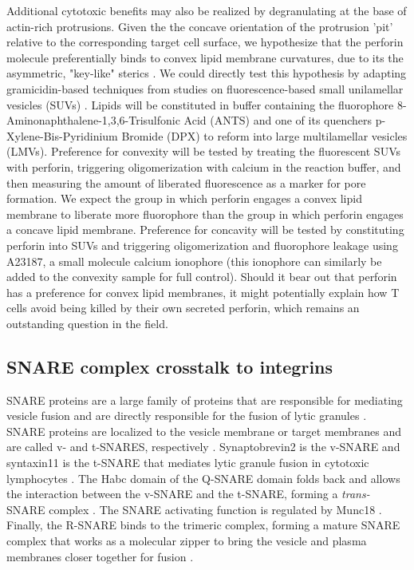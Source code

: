 Additional cytotoxic benefits may also be realized by degranulating at the base of actin-rich protrusions. Given the the concave orientation of the protrusion 'pit' relative to the corresponding target cell surface, we hypothesize that the perforin molecule preferentially binds to convex lipid membrane curvatures, due to its the  asymmetric, "key-like" sterics \cite{Law2010}. We could directly test this hypothesis by adapting gramicidin-based techniques from studies on fluorescence-based small unilamellar vesicles (SUVs) \cite{Ingolfsson2010,  Polozov2001}. Lipids will be constituted in buffer containing the fluorophore 8-Aminonaphthalene-1,3,6-Trisulfonic Acid (ANTS) and one of its quenchers p-Xylene-Bis-Pyridinium Bromide (DPX) to reform into large multilamellar vesicles (LMVs). Preference for convexity will be tested by treating the fluorescent SUVs with perforin, triggering oligomerization with calcium in the reaction buffer, and then measuring the amount of liberated fluorescence as a marker for pore formation. We expect the group in which perforin engages a convex lipid membrane to liberate more fluorophore than the group in which perforin engages a concave lipid membrane. Preference for concavity will be tested by constituting perforin into SUVs and triggering oligomerization and fluorophore leakage using A23187, a small molecule calcium ionophore (this ionophore can similarly be added to the convexity sample for full control).  Should it bear out that perforin has a preference for convex lipid membranes, it might potentially explain how T cells avoid being killed by their own secreted perforin, which remains an outstanding question in the field.

\subsection{SNARE complex crosstalk to integrins}
SNARE proteins are a large family of proteins that are responsible for mediating vesicle fusion and are directly responsible for the fusion of lytic granules \cite{Chang2017}.  SNARE proteins are localized to the vesicle membrane or target membranes and are called v- and t-SNARES, respectively \cite{Yoon2018}. Synaptobrevin2 is the v-SNARE and syntaxin11 is the t-SNARE that mediates lytic granule fusion in cytotoxic lymphocytes \cite{Halimani2014, Chitirala2019, Matti2013}. The Habc domain of the Q-SNARE domain folds back and allows the interaction between the v-SNARE and the t-SNARE, forming a \textit{trans-}SNARE complex \cite{Yoon2018}.  The SNARE activating function is regulated by Munc18 \cite{Spessott2017, Yoon2018, Baker2015}. Finally, the R-SNARE binds to the trimeric complex, forming a mature SNARE complex that works as a molecular zipper to bring the vesicle and plasma membranes closer together for fusion \cite{Agostino2017}.

